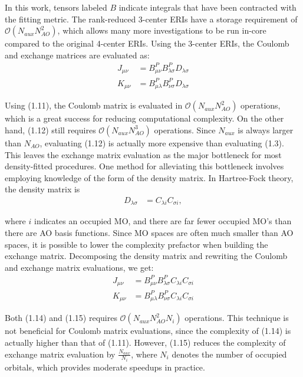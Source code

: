 \noindent In this work, tensors labeled $B$ indicate integrals that have been contracted with the fitting metric.
The rank-reduced 3-center ERIs have a storage requirement of $\mathcal{O}(N_{aux}N_{AO}^2)$, 
which allows many more investigations to be run in-core compared to the original 4-center ERIs. 
Using the 3-center ERIs, the Coulomb and exchange matrices are evaluated as: 
\begin{align}
J_{\mu \nu} &= B_{\mu \nu}^P B_{\lambda \sigma}^PD_{\lambda \sigma} \\
K_{\mu \nu} &= B_{\mu \lambda}^P B_{\nu \sigma}^PD_{\lambda \sigma}
\end{align}

\noindent Using (1.11), the Coulomb matrix is evaluated in $\mathcal{O}(N_{aux}N_{AO}^2)$ operations, which is a great success
for reducing computational complexity. On the other hand, (1.12) still requires $\mathcal{O}(N_{aux}N_{AO}^3)$ operations. 
Since $N_{aux}$ is always larger than $N_{AO}$, evaluating (1.12) is actually more expensive than evaluating (1.3).
This leaves the exchange matrix evaluation as the major bottleneck for most density-fitted procedures.
One method for alleviating this bottleneck involves employing knowledge 
of the form of the density matrix. In Hartree-Fock theory, the density matrix is 
\begin{align}
D_{\lambda \sigma} &= C_{\lambda i}C_{\sigma i},
\end{align}

\noindent where $i$ indicates an occupied MO, and there are far fewer occupied MO's than there are AO basis functions.
\noindent Since MO spaces are often much smaller than AO spaces, it is possible to lower the complexity prefactor when 
building the exchange matrix. 
Decomposing the density matrix and rewriting the Coulomb and exchange matrix evaluations, we get:
\begin{align}
J_{\mu \nu} &= B_{\mu \nu}^P B_{\lambda \sigma}^PC_{\lambda i}C_{\sigma i} \\
K_{\mu \nu} &= B_{\mu \lambda}^P B_{\nu \sigma}^PC_{\lambda i}C_{\sigma i}
\end{align}

\noindent Both (1.14) and (1.15) requires $\mathcal{O}(N_{aux}N_{AO}^2N_i)$ operations.
This technique is not beneficial for Coulomb matrix evaluations, since the complexity of (1.14) is actually
higher than that of (1.11). However, (1.15) reduces the complexity of exchange matrix evaluation by  
$\frac{N_{aux}}{N_i}$, where $N_i$ denotes the number of occupied orbitals, which provides moderate speedups in practice.

